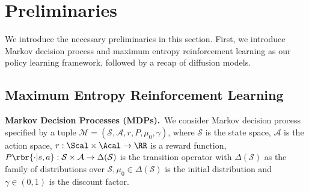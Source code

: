 
\section{Preliminaries}
We introduce the necessary preliminaries in this section. First, we introduce Markov decision process and maximum entropy reinforcement learning as our policy learning framework, followed by a recap of diffusion models.

\subsection{Maximum Entropy Reinforcement Learning}
\label{sec:max_ent_rl}
\textbf{Markov Decision Processes (MDPs).}~We consider Markov decision process~\citep{puterman2014markov} specified by a tuple $\mathcal{M}=(\mathcal{S}, \mathcal{A}, r, P, \mu_0, \gamma)$, where $\mathcal{S}$ is the state space, $\mathcal{A}$ is the action space, $r:\Scal\times\Acal\to\RR$ is a reward function,
$P\rbr{\cdot|s, a}: \mathcal{S} \times \mathcal{A} \rightarrow \Delta(\mathcal{S})$ is the transition operator with $\Delta(\mathcal{S})$ as the family of distributions over $\mathcal{S}, \mu_0 \in \Delta(\mathcal{S})$ is the initial distribution and $\gamma \in(0,1)$ is the discount factor. 

